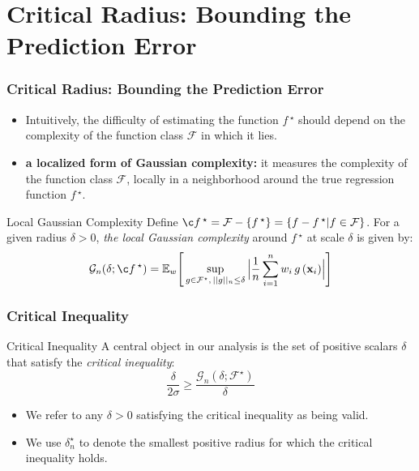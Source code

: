 \documentclass[11pt]{beamer}
\newcommand{\E}{\mathbb{E}}
\newcommand{\bx}{\mathbf{x}}
\newcommand{\cF}{\mathcal{F}}
\newcommand{\cG}{\mathcal{G}}
\newcommand{\fstar}{f\,^\star}
\begin{document}
	
		\section{Critical Radius: Bounding the Prediction Error}
		\frame{\sectionpage}
		
		\begin{frame}
			\frametitle{Critical Radius: Bounding the Prediction Error}
			\begin{itemize}

			\item Intuitively, the difficulty of estimating the function $\fstar$ should depend on the complexity of the function class $\cF$ in which it lies.
			\item  \textbf{a localized form of Gaussian complexity:} it measures the complexity of the function class $\cF$, locally in a neighborhood around the true regression function $\fstar$.
			\end{itemize}		
			\begin{block}{Local Gaussian Complexity}
				Define $\c\fstar = \cF - \{\fstar\} = \{f - \fstar | f \in \cF\}$. For a given radius $\delta > 0$, \textit{the local Gaussian complexity} around $\fstar$ at scale $\delta$ is given by:
				\begin{equation*}
					\cG_n(\delta; \c\fstar) = \E_w \Bigg[\sup_{g \in \cF^\star,\, ||g||_n \leq \delta} \Big|\frac{1}{n} \sum_{i = 1}^{n} w_i\, g\,(\bx_i)\Big|\Bigg]
				\end{equation*}				
			\end{block}		
		\end{frame}
	
				\begin{frame}
			\frametitle{Critical Inequality}
			
			\begin{block}{Critical Inequality}
				A central object in our analysis is the set of positive scalars $\delta$ that satisfy the \textit{critical inequality}:
				\begin{equation*}
				\frac{\delta}{2\sigma} \geq \frac{\cG_n(\delta; \cF^\star)}{\delta}
				\end{equation*}			
			\end{block}
			
			\begin{itemize}							
				\item We refer to any $\delta > 0$ satisfying the critical inequality as being valid.
				\item We use $\delta^\star_n$ to denote the smallest positive radius for which the critical inequality holds.
			\end{itemize}
		\end{frame}
		
\end{document}
